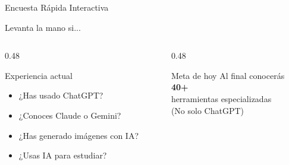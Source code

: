 \documentclass[aspectratio=169,xcolor={dvipsnames}]{beamer}
\begin{document}
	\begin{frame}{Encuesta Rápida Interactiva}
		
		\begin{center}
			{\large Levanta la mano si...}
		\end{center}
		
		\vspace{0.5cm}
		
		\begin{columns}[T]
			\begin{column}{0.48\textwidth}
				\begin{block}{Experiencia actual}
					\begin{itemize}
						\item ¿Has usado ChatGPT?
						\item ¿Conoces Claude o Gemini?
						\item ¿Has generado imágenes con IA?
						\item ¿Usas IA para estudiar?
					\end{itemize}
				\end{block}
			\end{column}
			
			\begin{column}{0.48\textwidth}
				\begin{exampleblock}{Meta de hoy}
					\centering
					Al final conocerás\\[0.3cm]
					{\Huge \textbf{40+}}\\[0.2cm]
					{\large herramientas especializadas}\\[0.5cm]
					
					\small (No solo ChatGPT)
				\end{exampleblock}
			\end{column}
		\end{columns}
		
	\end{frame}
	
\end{document}
